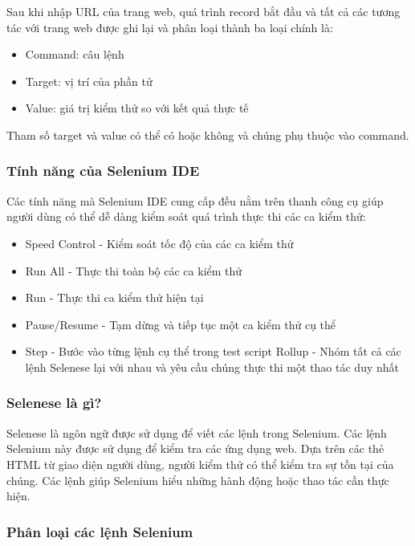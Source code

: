 \documentclass[./../main_file.tex]{subfiles}
\begin{document}
	Sau khi nhập URL của trang web, quá trình record bắt đầu và tất cả các tương tác với trang web được ghi lại và phân loại thành ba loại chính là:
	
	\begin{itemize}
		\item Command: câu lệnh
		\item Target: vị trí của phần tử
		\item Value: giá trị kiểm thử so với kết quả thực tế
	\end{itemize}

	Tham số target và value có thể có hoặc không và chúng phụ thuộc vào command.
	
	\subsubsection{Tính năng của Selenium IDE}
	
	Các tính năng mà Selenium IDE cung cấp đều nằm trên thanh công cụ giúp người dùng có thể dễ dàng kiểm soát quá trình thực thi các ca kiểm thử:
	
	\begin{itemize}
		\item Speed Control - Kiểm soát tốc độ của các ca kiểm thử
		\item Run All - Thực thi toàn bộ các ca kiểm thử
		\item Run - Thực thi ca kiểm thử hiện tại
		\item Pause/Resume - Tạm dừng và tiếp tục một ca kiểm thử cụ thể
		\item Step - Bước vào từng lệnh cụ thể trong test script
		Rollup - Nhóm tất cả các lệnh Selenese lại với nhau và yêu cầu chúng thực thi một thao tác duy nhất
	\end{itemize}

	\subsubsection{Selenese là gì?}
	
	Selenese là ngôn ngữ được sử dụng để viết các lệnh trong Selenium. Các lệnh Selenium này được sử dụng để kiểm tra các ứng dụng web. Dựa trên các thẻ HTML từ giao diện người dùng, người kiểm thử có thể kiểm tra sự tồn tại của chúng. Các lệnh giúp Selenium hiểu những hành động hoặc thao tác cần thực hiện.
	
	\subsubsection{Phân loại các lệnh Selenium}
	
\end{document}
